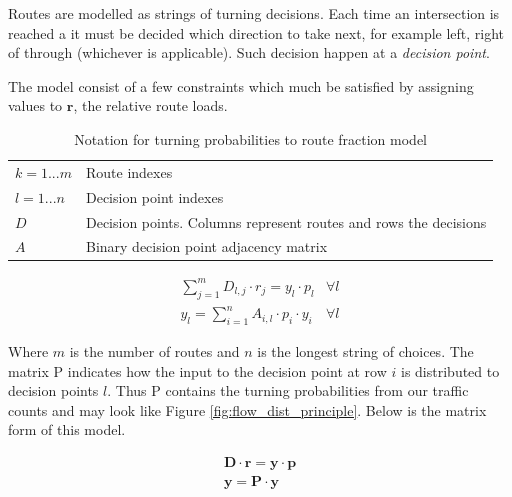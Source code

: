 Routes are modelled as strings of turning decisions. Each time an intersection is reached a it must be decided which direction to take next, for example left, right of through (whichever is applicable). Such decision happen at a \textit{decision point}.

The model consist of a few constraints which much be satisfied by assigning values to $\mathbf{r}$, the relative route loads.

\begin{table}[!ht]
\begin{center}
\begin{tabular}{ll}
\hline
$k = 1...m$ & Route indexes \\
$l = 1...n$ & Decision point indexes  \\
$D$ & Decision points. Columns represent routes and rows the decisions  \\
$A$ & Binary decision point adjacency matrix  \\
\hline
\end{tabular}
\end{center}
\caption{Notation for turning probabilities to route fraction model}
\end{table}

\begin{eqnarray}
\sum_{j = 1}^{m}{D_{l,j} \cdot r_j} = y_l \cdot p_l & \forall l \\
y_l = \sum_{i = 1}^{n}{A_{i,l} \cdot p_i \cdot y_i} & \forall l
\end{eqnarray}

Where $m$ is the number of routes and $n$ is the longest string of choices. The matrix P indicates how the input to the decision point at row $i$ is distributed to decision points $l$. Thus P contains the turning probabilities from our traffic counts and may look like Figure \ref{fig:flow_dist_principle}. Below is the matrix form of this model.

\begin{eqnarray}
\mathbf{D} \cdot \mathbf{r} = \mathbf{y} \cdot \mathbf{p} \\
\mathbf{y} = \mathbf{P} \cdot \mathbf{y}
\end{eqnarray}

